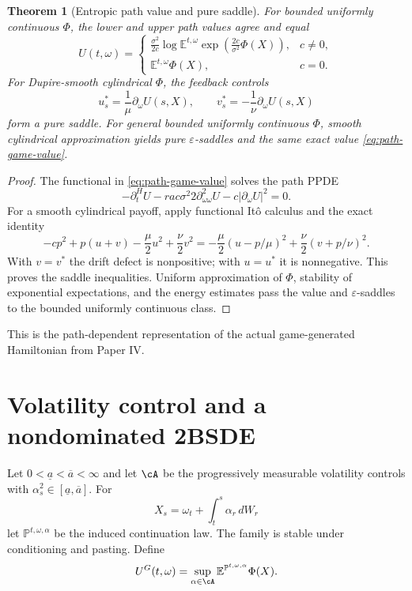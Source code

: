 \documentclass[11pt,reqno]{amsart}
\newtheorem{theorem}{Theorem}[section]
\theoremstyle{definition}
\theoremstyle{remark}
\newcommand{\E}{\mathbb E}
\newcommand{\Pp}{\mathbb P}
\newcommand{\abs}[1]{\left\lvert #1\right\rvert}
\begin{document}
\begin{theorem}[Entropic path value and pure saddle]\label{thm:path-game}
For bounded uniformly continuous $\Phi$, the lower and upper path values agree
and equal
\begin{equation}\label{eq:path-game-value}
 U(t,\omega)=
 \begin{cases}
 \displaystyle\frac{\sigma^2}{2c}
 \log\E^{t,\omega}
 \exp\left(\frac{2c}{\sigma^2}\Phi(X)\right),&c\ne0,\\[2ex]
 \E^{t,\omega}\Phi(X),&c=0.
 \end{cases}
\end{equation}
For Dupire-smooth cylindrical $\Phi$, the feedback controls
\[
 u_s^*=\frac1\mu\partial_\omega U(s,X),
 \qquad
 v_s^*=-\frac1\nu\partial_\omega U(s,X)
\]
form a pure saddle.  For general bounded uniformly continuous $\Phi$, smooth
cylindrical approximation yields pure $\varepsilon$-saddles and the same exact
value \eqref{eq:path-game-value}.
\end{theorem}

\begin{proof}
The functional in \eqref{eq:path-game-value} solves the path PPDE
\[
 -\partial_t^HU-rac{\sigma^2}{2}
 \partial_{\omega\omega}^2U-c\abs{\partial_\omega U}^2=0.
\]
For a smooth cylindrical payoff, apply functional It\^o calculus and the exact
identity
\[
 -cp^2+p(u+v)-\frac\mu2u^2+
 \frac\nu2v^2
 =-\frac\mu2(u-p/\mu)^2+
 \frac\nu2(v+p/\nu)^2.
\]
With $v=v^*$ the drift defect is nonpositive; with $u=u^*$ it is
nonnegative.  This proves the saddle inequalities.  Uniform approximation of
$\Phi$, stability of exponential expectations, and the energy estimates pass
the value and $\varepsilon$-saddles to the bounded uniformly continuous class.
\end{proof}

This is the path-dependent representation of the actual game-generated
Hamiltonian from Paper IV.

\section{Volatility control and a nondominated 2BSDE}\label{sec:2BSDE}

Let $0<\underline a<\overline a<\infty$ and let $\cA$ be the progressively
measurable volatility controls with
$\alpha_s^2\in[\underline a,\overline a]$.  For
\[
 X_s=\omega_t+\int_t^s\alpha_r\,dW_r
\]
let $\Pp^{t,\omega,\alpha}$ be the induced continuation law.  The family is
stable under conditioning and pasting.  Define
\begin{equation}\label{eq:Gvalue}
 U^G(t,\omega)=\sup_{\alpha\in\cA}
 \E^{\Pp^{t,\omega,\alpha}}\Phi(X).
\end{equation}
\end{document}
